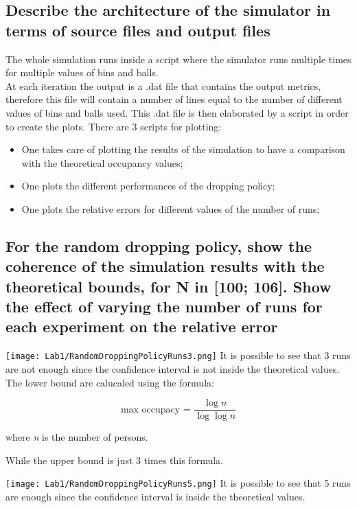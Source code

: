 \documentclass{report}
\begin{document}
	\subsection{Describe the architecture of the simulator in terms of source files and output files}
			The whole simulation runs inside a script where the simulator runs multiple times for multiple values of bins and balls. \\
			At each iteration the output is a .dat file that contains the output metrics, therefore this file will contain a number of lines equal to the number of different values of bins and balls used. This .dat file is then elaborated by a script in order to create the plots. There are 3 scripts for plotting:
			\begin{itemize}
				\item One takes care of plotting the results of the simulation to have a comparison with the theoretical occupancy values;
				\item One plots the different performances of the dropping policy;
				\item One plots the relative errors for different values of the number of runs;
			\end{itemize}
			
			\subsection{For the random dropping policy, show the coherence of the simulation results with the theoretical bounds, for N in [100; 10\^6]. Show the effect of varying the number of runs for each experiment on the relative error}
			
			\texttt{[image: Lab1/RandomDroppingPolicyRuns3.png]}
			It is possible to see that 3 runs are not enough since the confidence interval is not inside the theoretical values.
			The lower bound are calucaled using the formula:
			
			\begin{equation} \label{eq:1}
				 \text{max occupacy = }\frac{\log n}{\log \log n} 
			\end{equation}
			\begin{center}
					where \emph{n} is the number of persons.
			\end{center}
			While the upper bound is just 3 times this formula.
			
			\texttt{[image: Lab1/RandomDroppingPolicyRuns5.png]}
			It is possible to see that 5 runs are enough since the confidence interval is inside the theoretical values.
			
\end{document}
